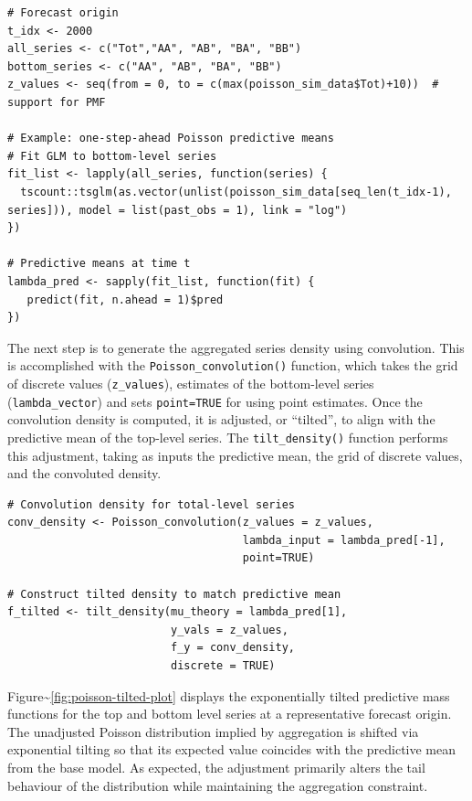 \begin{verbatim}
# Forecast origin 
t_idx <- 2000
all_series <- c("Tot","AA", "AB", "BA", "BB")
bottom_series <- c("AA", "AB", "BA", "BB")
z_values <- seq(from = 0, to = c(max(poisson_sim_data$Tot)+10))  # support for PMF

# Example: one-step-ahead Poisson predictive means 
# Fit GLM to bottom-level series
fit_list <- lapply(all_series, function(series) {
  tscount::tsglm(as.vector(unlist(poisson_sim_data[seq_len(t_idx-1), series])), model = list(past_obs = 1), link = "log")
})

# Predictive means at time t
lambda_pred <- sapply(fit_list, function(fit) {
   predict(fit, n.ahead = 1)$pred
})
\end{verbatim}

The next step is to generate the aggregated series density using convolution. This is accomplished with the \texttt{Poisson\_convolution()} function, which takes the grid of discrete values (\texttt{z\_values}), estimates of the bottom-level series (\texttt{lambda\_vector}) and sets \texttt{point=TRUE} for using point estimates. Once the convolution density is computed, it is adjusted, or ``tilted'', to align with the predictive mean of the top-level series. The \texttt{tilt\_density()} function performs this adjustment, taking as inputs the predictive mean, the grid of discrete values, and the convoluted density.

\begin{verbatim}
# Convolution density for total-level series 
conv_density <- Poisson_convolution(z_values = z_values,
                                    lambda_input = lambda_pred[-1],
                                    point=TRUE)

# Construct tilted density to match predictive mean 
f_tilted <- tilt_density(mu_theory = lambda_pred[1],
                         y_vals = z_values,
                         f_y = conv_density,
                         discrete = TRUE)
\end{verbatim}

Figure\textasciitilde{}\ref{fig:poisson-tilted-plot} displays the exponentially tilted predictive mass functions for the top and bottom level series at a representative forecast origin. The unadjusted Poisson distribution implied by aggregation is shifted via exponential tilting so that its expected value coincides with the predictive mean from the base model. As expected, the adjustment primarily alters the tail behaviour of the distribution while maintaining the aggregation constraint.

